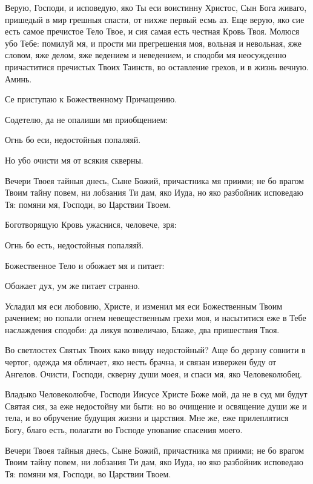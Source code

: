 \begin{mymulticols}

Верую, Господи, и исповедую, яко Ты еси воистинну Христос, Сын Бога живаго, пришедый в мир грешныя спасти, от нихже первый есмь аз. Еще верую, яко сие есть самое пречистое Тело Твое, и сия самая есть честная Кровь Твоя. Молюся убо Тебе: помилуй мя, и прости ми прегрешения моя, вольная и невольная, яже словом, яже делом, яже ведением и неведением, и сподоби мя неосужденно причаститися пречистых Твоих Таинств, во оставление грехов, и в жизнь вечную. Аминь.


Се приступаю к Божественному Причащению.

Содетелю, да не опалиши мя приобщением:

Огнь бо еси, недостойныя попаляяй.

Но убо очисти мя от всякия скверны.


Вечери Твоея тайныя днесь, Сыне Божий, причастника мя приими; не бо врагом Твоим тайну повем, ни лобзания Ти дам, яко Иуда, но яко разбойник исповедаю Тя: помяни мя, Господи, во Царствии Твоем.


Боготворящую Кровь ужаснися, человече, зря:

Огнь бо есть, недостойныя попаляяй.

Божественное Тело и обожает мя и питает:

Обожает дух, ум же питает странно.


Усладил мя еси любовию, Христе, и изменил мя еси Божественным Твоим рачением; но попали огнем невещественным грехи моя, и насытитися еже в Тебе наслаждения сподоби: да ликуя возвеличаю, Блаже, два пришествия Твоя.

Во светлостех Святых Твоих како вниду недостойный? Аще бо дерзну совнити в чертог, одежда мя обличает, яко несть брачна, и связан извержен буду от Ангелов. Очисти, Господи, скверну души моея, и спаси мя, яко Человеколюбец.


Владыко Человеколюбче, Господи Иисусе Христе Боже мой, да не в суд ми будут Святая сия, за еже недостойну ми быти: но во очищение и освящение души же и тела, и во обручение будущия жизни и царствия. Мне же, еже прилеплятися Богу, благо есть, полагати во Господе упование спасения моего.


Вечери Твоея тайныя днесь, Сыне Божий, причастника мя приими; не бо врагом Твоим тайну повем, ни лобзания Ти дам, яко Иуда, но яко разбойник исповедаю Тя: помяни мя, Господи, во Царствии Твоем.

\end{mymulticols}

